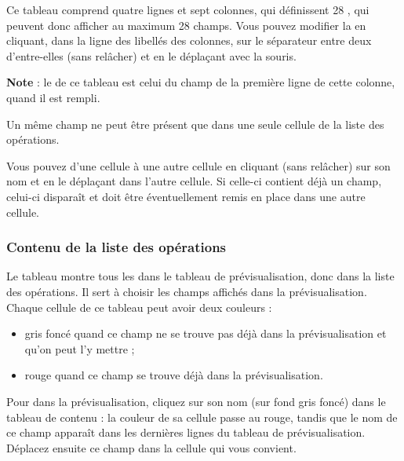 Ce tableau comprend quatre lignes et sept colonnes, qui définissent 28 , qui peuvent donc afficher au maximum 28 champs. Vous pouvez modifier la  en cliquant, dans la ligne des libellés des colonnes, sur le séparateur entre deux d'entre-elles (sans relâcher) et en le déplaçant avec la souris.

\textbf{Note} : le 
 de ce tableau est celui du champ de la première ligne de cette colonne, quand il est rempli.

Un même champ ne peut être présent que dans une seule cellule de la liste des opérations.

Vous pouvez 
 d'une cellule à une autre cellule en cliquant (sans relâcher) sur son nom et en le déplaçant dans l'autre cellule. Si celle-ci contient déjà un champ, celui-ci disparaît et doit être éventuellement remis en place dans une autre cellule.


\subsubsection{Contenu de la liste des opérations}

Le tableau montre tous les  dans le tableau de prévisualisation, donc dans la liste des opérations. Il sert à choisir les champs affichés dans la prévisualisation. Chaque cellule de ce tableau peut avoir deux couleurs :

\begin{itemize}
	\item gris foncé{\couleur} quand ce champ ne se trouve pas déjà dans la prévisualisation et qu'on peut l'y mettre ;
	\item rouge{\couleur} quand ce champ se trouve déjà dans la prévisualisation.
\end{itemize}

Pour  dans la prévisualisation, cliquez sur son nom (sur fond gris foncé{\couleur}) dans le tableau de contenu : la couleur de sa cellule passe au rouge{\couleur}, tandis que le nom de ce champ apparaît dans les dernières lignes du tableau de prévisualisation. Déplacez ensuite ce champ dans la cellule qui vous convient.

